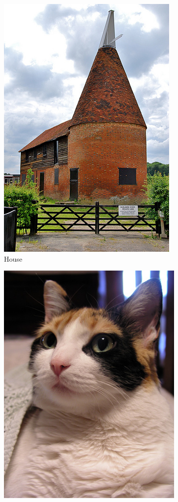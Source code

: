 \documentclass[conference]{IEEEtran}
\begin{document}
\begin{spacing}{0.9}
\begin{figure}
\centering
\begin{subfigure}{.15\textwidth}
  \centering
  \includegraphics[scale=0.1]{classTypeExample1.jpg}
  \caption{House}
\end{subfigure}%
\begin{subfigure}{.15\textwidth}
  \centering
  \includegraphics[scale=0.14]{classTypeExample2.jpg}

\end{subfigure}
\end{figure}
\end{spacing}
\end{document}

